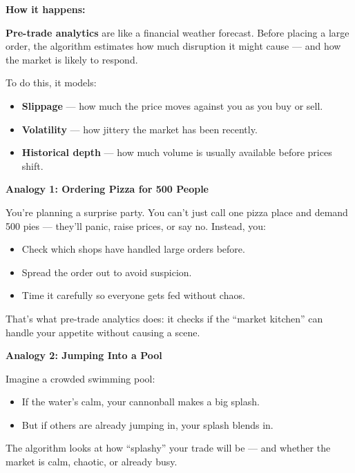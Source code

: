 \textbf{How it happens:}

\textbf{Pre-trade analytics} are like a financial weather forecast.  
Before placing a large order, the algorithm estimates how much disruption it might cause — and how the market is likely to respond.

To do this, it models:

\begin{itemize}
  \item \textbf{Slippage} — how much the price moves against you as you buy or sell.
  \item \textbf{Volatility} — how jittery the market has been recently.
  \item \textbf{Historical depth} — how much volume is usually available before prices shift.
\end{itemize}

\medskip

\textbf{Analogy 1: Ordering Pizza for 500 People}

You’re planning a surprise party. You can’t just call one pizza place and demand 500 pies — they’ll panic, raise prices, or say no.  
Instead, you:

\begin{itemize}
  \item Check which shops have handled large orders before.
  \item Spread the order out to avoid suspicion.
  \item Time it carefully so everyone gets fed without chaos.
\end{itemize}

That’s what pre-trade analytics does: it checks if the “market kitchen” can handle your appetite without causing a scene.

\medskip

\textbf{Analogy 2: Jumping Into a Pool}

Imagine a crowded swimming pool:

\begin{itemize}
  \item If the water’s calm, your cannonball makes a big splash.
  \item But if others are already jumping in, your splash blends in.
\end{itemize}

The algorithm looks at how “splashy” your trade will be — and whether the market is calm, chaotic, or already busy.

\medskip

